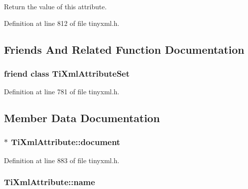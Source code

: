 Return the value of this attribute. 



Definition at line 812 of file tinyxml.h.



\subsection{Friends And Related Function Documentation}
\hypertarget{class_ti_xml_attribute_a35a7b7f89f708527677d5078d41ce0bf}{
\subsubsection[{TiXmlAttributeSet}]{\setlength{\rightskip}{0pt plus 5cm}friend class {\bf TiXmlAttributeSet}}}
\label{class_ti_xml_attribute_a35a7b7f89f708527677d5078d41ce0bf}


Definition at line 781 of file tinyxml.h.



\subsection{Member Data Documentation}
\hypertarget{class_ti_xml_attribute_ada41d3cff50cd33a78072806f88d4433}{
\subsubsection[{document}]{$\ast$ {\bf TiXmlAttribute::document}}}
\label{class_ti_xml_attribute_ada41d3cff50cd33a78072806f88d4433}


Definition at line 883 of file tinyxml.h.

\hypertarget{class_ti_xml_attribute_af5e5942b90c6ea5506b3d3ab464d0e1c}{
\subsubsection[{name}]{ {\bf TiXmlAttribute::name}}}
\label{class_ti_xml_attribute_af5e5942b90c6ea5506b3d3ab464d0e1c}


